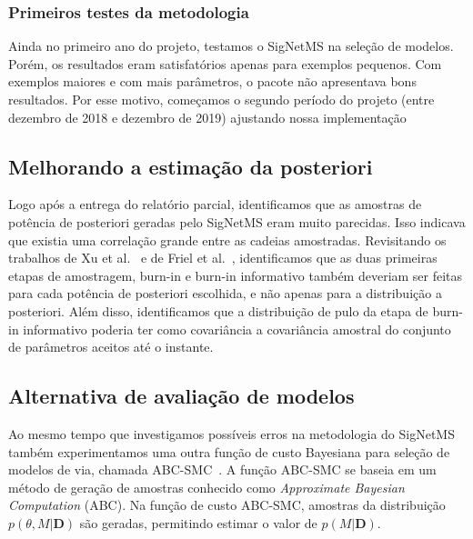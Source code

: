 \documentclass[12pt]{article}
\newcommand{\foreignword}[1]{\textit{#1}}
\begin{document}
\subsubsection{Primeiros testes da metodologia}
Ainda no primeiro ano do projeto, testamos o SigNetMS na seleção de 
modelos. Porém, os resultados eram satisfatórios apenas para exemplos
pequenos. Com exemplos maiores e com mais parâmetros, o pacote não
apresentava bons resultados. Por esse motivo, começamos o segundo
período do projeto (entre dezembro de 2018 e dezembro de 2019) ajustando
nossa implementação 

\subsection{Melhorando a estimação da posteriori}




Logo após a entrega do relatório parcial, identificamos que as amostras
de potência de posteriori geradas pelo SigNetMS eram muito parecidas.
Isso indicava que existia uma correlação grande entre as cadeias
amostradas. Revisitando os trabalhos de Xu et al.~\cite{Xu2010} e de Friel
et al.~\cite{Friel2008}, identificamos que as duas primeiras etapas de
amostragem, burn-in e burn-in informativo também deveriam ser feitas
para cada potência de posteriori escolhida, e não apenas para a
distribuição a posteriori. Além disso, identificamos que a distribuição
de pulo da etapa de burn-in informativo poderia ter como covariância a
covariância amostral do conjunto de parâmetros aceitos até o instante. 

\subsection{Alternativa de avaliação de modelos}
Ao mesmo tempo que investigamos possíveis erros na metodologia do
SigNetMS também experimentamos uma outra função de custo Bayesiana para
seleção de modelos de via, chamada ABC-SMC~\cite{Liepe2014}. A função
ABC-SMC se baseia em um método de geração de amostras conhecido como
\foreignword{Approximate Bayesian Computation} (ABC). Na função de custo
ABC-SMC, amostras da distribuição $p(\theta, M | \mathbf{D})$ são 
geradas, permitindo estimar o valor de $p (M | \mathbf{D})$.
\end{document}
